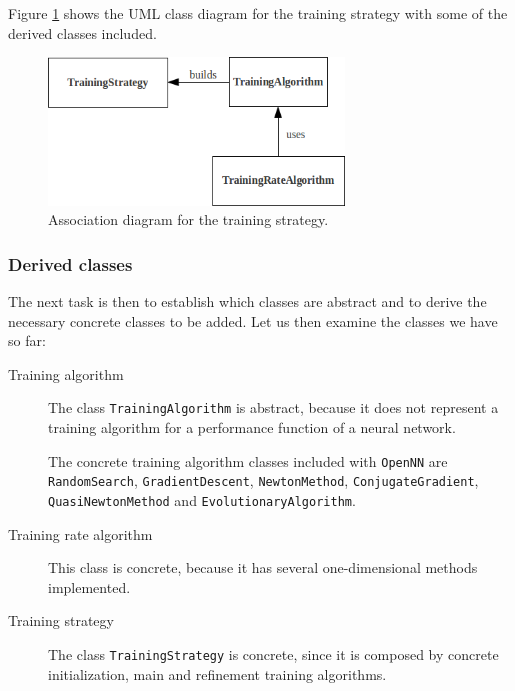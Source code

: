 Figure \ref{AssociationDiagramTrainingStrategy} shows the UML class diagram for
the training strategy with some of the derived classes included.

\begin{figure}[h!]
\includegraphics[width=0.7\textwidth]{training_strategy/training_stategy_association_diagram.png}
\caption{Association diagram for the training strategy.}\label{AssociationDiagramTrainingStrategy}
\end{figure}


\subsubsection{Derived classes}

The next task is then to establish which classes are abstract and
to derive the necessary concrete classes to be added. Let us then examine the classes we have so far:

\begin{description}

\item[Training algorithm] The class \lstinline"TrainingAlgorithm" is abstract, because it does not
represent a training algorithm for a performance function of a neural network.

The concrete training algorithm classes included with \texttt{OpenNN} are \lstinline"RandomSearch", \lstinline"GradientDescent", \lstinline"NewtonMethod", \lstinline"ConjugateGradient", \lstinline"QuasiNewtonMethod" and \lstinline"EvolutionaryAlgorithm".

\item[Training rate algorithm] This class is concrete, because it has several one-dimensional methods implemented. 

\item[Training strategy] The class \lstinline"TrainingStrategy" is concrete, since it is composed by concrete initialization, main and refinement training algorithms. 

\end{description}

